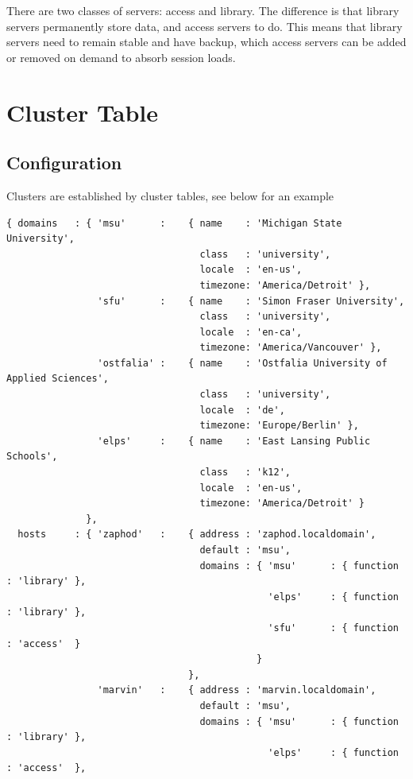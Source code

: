 There are two classes of servers: access and library. The difference is that library servers permanently store data, and access servers to do. This means that library servers need to remain stable and have backup, which access servers can be added or removed on demand to absorb session loads.
\section{Cluster Table}
\subsection{Configuration}\label{clustertable}
Clusters are established by cluster tables, see below for an example
\begin{verbatim}
{ domains   : { 'msu'      :    { name    : 'Michigan State University',
                                  class   : 'university',
                                  locale  : 'en-us', 
                                  timezone: 'America/Detroit' },
                'sfu'      :    { name    : 'Simon Fraser University',
                                  class   : 'university',
                                  locale  : 'en-ca',
                                  timezone: 'America/Vancouver' },
                'ostfalia' :    { name    : 'Ostfalia University of Applied Sciences',
                                  class   : 'university',
                                  locale  : 'de',
                                  timezone: 'Europe/Berlin' },
                'elps'     :    { name    : 'East Lansing Public Schools',
                                  class   : 'k12',
                                  locale  : 'en-us',
                                  timezone: 'America/Detroit' }
              },
  hosts     : { 'zaphod'   :    { address : 'zaphod.localdomain',
                                  default : 'msu',
                                  domains : { 'msu'      : { function : 'library' },
                                              'elps'     : { function : 'library' },
                                              'sfu'      : { function : 'access'  }
                                            }
                                },
                'marvin'   :    { address : 'marvin.localdomain',
                                  default : 'msu',
                                  domains : { 'msu'      : { function : 'library' },
                                              'elps'     : { function : 'access'  },

\end{verbatim}
